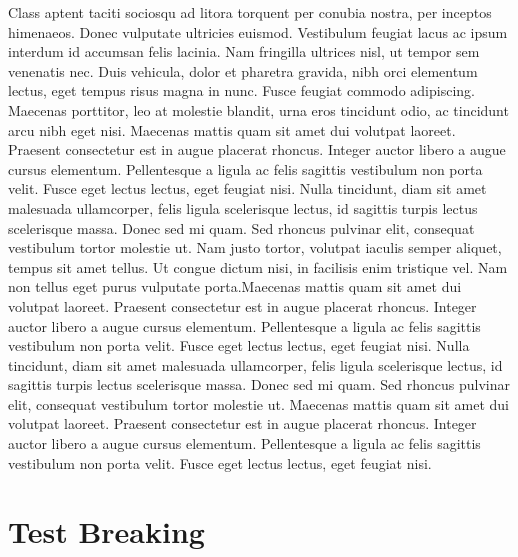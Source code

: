 Class aptent taciti sociosqu ad litora torquent per conubia nostra, per inceptos himenaeos. Donec vulputate ultricies euismod. Vestibulum feugiat lacus ac ipsum interdum id accumsan felis lacinia. Nam fringilla ultrices nisl, ut tempor sem venenatis nec. Duis vehicula, dolor et pharetra gravida, nibh orci elementum lectus, eget tempus risus magna in nunc. Fusce feugiat commodo adipiscing. Maecenas porttitor, leo at molestie blandit, urna eros tincidunt odio, ac tincidunt arcu nibh eget nisi. Maecenas mattis quam sit amet dui volutpat laoreet. Praesent consectetur est in augue placerat rhoncus. Integer auctor libero a augue cursus elementum. Pellentesque a ligula ac felis sagittis vestibulum non porta velit. Fusce eget lectus lectus, eget feugiat nisi. Nulla tincidunt, diam sit amet malesuada ullamcorper, felis ligula scelerisque lectus, id sagittis turpis lectus scelerisque massa. Donec sed mi quam. Sed rhoncus pulvinar elit, consequat vestibulum tortor molestie ut. Nam justo tortor, volutpat iaculis semper aliquet, tempus sit amet tellus. Ut congue dictum nisi, in facilisis enim tristique vel. Nam non tellus eget purus vulputate porta.Maecenas mattis quam sit amet dui volutpat laoreet. Praesent consectetur est in augue placerat rhoncus. Integer auctor libero a augue cursus elementum. Pellentesque a ligula ac felis sagittis vestibulum non porta velit. Fusce eget lectus lectus, eget feugiat nisi. Nulla tincidunt, diam sit amet malesuada ullamcorper, felis ligula scelerisque lectus, id sagittis turpis lectus scelerisque massa. Donec sed mi quam. Sed rhoncus pulvinar elit, consequat vestibulum tortor molestie ut. Maecenas mattis quam sit amet dui volutpat laoreet. Praesent consectetur est in augue placerat rhoncus. Integer auctor libero a augue cursus elementum. Pellentesque a ligula ac felis sagittis vestibulum non porta velit. Fusce eget lectus lectus, eget feugiat nisi. 

\section{Test Breaking}

